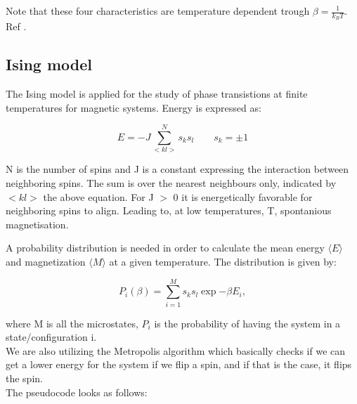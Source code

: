 \documentclass[../main.tex]{subfiles}
\begin{document}
    \noindent Note that these four characteristics are temperature dependent trough $\beta = \frac{1}{k_B T}$.\\
    Ref \cite{Mortenstatphys2019}.


    \subsection{Ising model}
    The Ising model is applied for the study of phase transistions at finite temperatures
    for magnetic systems. Energy is expressed as:

    \begin{equation}
      E = -J \sum  _{<kl>}^N s_ks_l \qquad s_k = \pm 1
    \end{equation}

    N is the number of spins and J is a constant expressing the interaction between neighboring spins. The sum is over the nearest neighbours only, indicated by $<kl>$ the above equation. For J $>$ 0 it is energetically favorable for neighboring spins to align. Leading to, at low temperatures, T, spontanious magnetisation.

    A probability distribution is needed in order to calculate the mean energy $\langle E \rangle$ and magnetization $\langle M \rangle$ at a given temperature. The distribution is given by:

    \begin{equation}
      P_i(\beta)=  \sum  _{i = 1}^M s_ks_l \exp{-\beta E_i},
    \end{equation}

    where M is all the microstates, $P_i$ is the probability of having the system in a state/configuration i.\\

    We are also utilizing the Metropolis algorithm which basically checks if we can get a lower energy for the system if we flip a spin, and if that is the case, it flips the spin.\\
    The pseudocode looks as follows:

    
\end{document}
